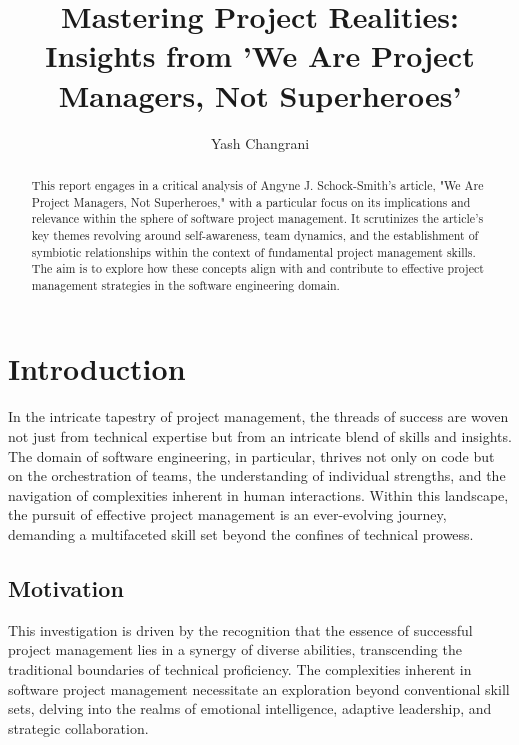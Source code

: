 \documentclass[runningheads]{llncs}
\begin{document}
%
\title{Mastering Project Realities: Insights from 'We Are Project Managers, Not Superheroes'}
%
%
\author{Yash Changrani}
%
%
%
\maketitle              %
%
\begin{abstract}
This report engages in a critical analysis of Angyne J. Schock-Smith's article, "We Are Project Managers, Not Superheroes," with a particular focus on its implications and relevance within the sphere of software project management. It scrutinizes the article's key themes revolving around self-awareness, team dynamics, and the establishment of symbiotic relationships within the context of fundamental project management skills. The aim is to explore how these concepts align with and contribute to effective project management strategies in the software engineering domain.
\end{abstract}
%
%
%
\section{Introduction}

In the intricate tapestry of project management, the threads of success are woven not just from technical expertise but from an intricate blend of skills and insights. The domain of software engineering, in particular, thrives not only on code but on the orchestration of teams, the understanding of individual strengths, and the navigation of complexities inherent in human interactions. Within this landscape, the pursuit of effective project management is an ever-evolving journey, demanding a multifaceted skill set beyond the confines of technical prowess.

\subsection{Motivation}
This investigation is driven by the recognition that the essence of successful project management lies in a synergy of diverse abilities, transcending the traditional boundaries of technical proficiency. The complexities inherent in software project management necessitate an exploration beyond conventional skill sets, delving into the realms of emotional intelligence, adaptive leadership, and strategic collaboration.
\end{document}
